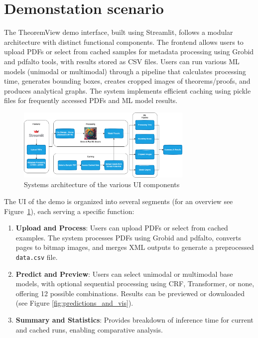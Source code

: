 \documentclass[runningheads]{llncs}
\begin{document}
\section{Demonstation scenario}

The TheoremView demo interface, built using Streamlit, follows a modular architecture with distinct functional components. The frontend allows users to upload PDFs or select from cached samples for metadata processing using Grobid and pdfalto tools, with results stored as CSV files. Users can run various ML models (unimodal or multimodal) through a pipeline that calculates processing time, generates bounding boxes, creates cropped images of theorems/proofs, and produces analytical graphs. The system implements efficient caching using pickle files for frequently accessed PDFs and ML model results.

\begin{figure}[h]
    \centering
    \includegraphics[width=0.75\textwidth]{images/sys-demo-arch.png}
    \caption{Systems architecture of the various UI components
    }
    \label{fig:system-arch}
\end{figure}

The UI of the demo is organized into several segments (for an overview see Figure~\ref{fig:system-arch}), each serving a specific function:

\begin{enumerate}
    \item \textbf{Upload and Process}: Users can upload PDFs or select from cached examples. The system processes PDFs using Grobid and pdfalto, converts pages to bitmap images, and merges XML outputs to generate a preprocessed \texttt{data.csv} file.

    \item \textbf{Predict and Preview}: Users can select unimodal or multimodal base models, with optional sequential processing using CRF, Transformer, or none, offering 12 possible combinations. Results can be previewed or downloaded (see Figure \ref{fig:predictions_and_vis}).

    \item \textbf{Summary and Statistics}: Provides breakdown of inference time for current and cached runs, enabling comparative analysis.
\end{enumerate}
\end{document}
